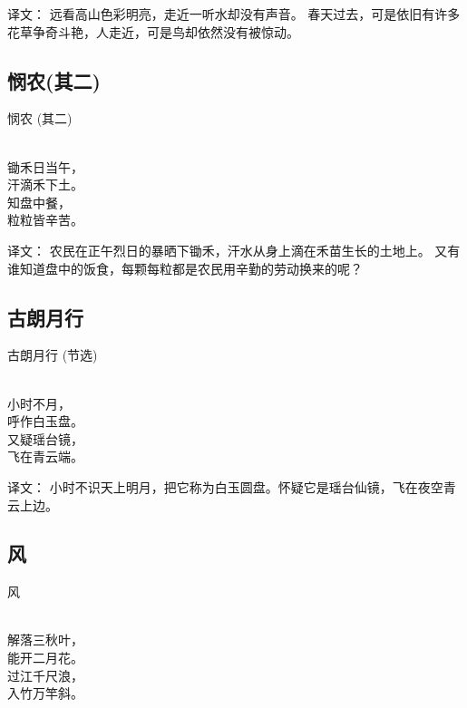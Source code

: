 译文：
远看高山色彩明亮，走近一听水却没有声音。
春天过去，可是依旧有许多花草争奇斗艳，人走近，可是鸟却依然没有被惊动。

\subsection{悯农(其二)}
\begin{pinyinscope}
	\noindent \huge 悯农 {\kaishu \large (其二) }
	
	 \\
	
	\noindent 锄禾日当午，\\汗滴禾下土。\\
	知盘中餐，\\粒粒皆辛苦。
\end{pinyinscope}

译文：
农民在正午烈日的暴晒下锄禾，汗水从身上滴在禾苗生长的土地上。
又有谁知道盘中的饭食，每颗每粒都是农民用辛勤的劳动换来的呢？

\subsection{古朗月行}
\begin{pinyinscope}
	\noindent \huge 古朗月行 {\kaishu \large (节选) }
	
	 \\
	
	\noindent 小时不月，\\呼作白玉盘。\\
	又疑瑶台镜，\\飞在青云端。
\end{pinyinscope}

译文：
小时不识天上明月，把它称为白玉圆盘。怀疑它是瑶台仙镜，飞在夜空青云上边。

\subsection{风}
\begin{pinyinscope}
	\noindent \huge 风
	
	 \\
	
	\noindent 解落三秋叶，\\能开二月花。\\
	过江千尺浪，\\入竹万竿斜。
\end{pinyinscope}

